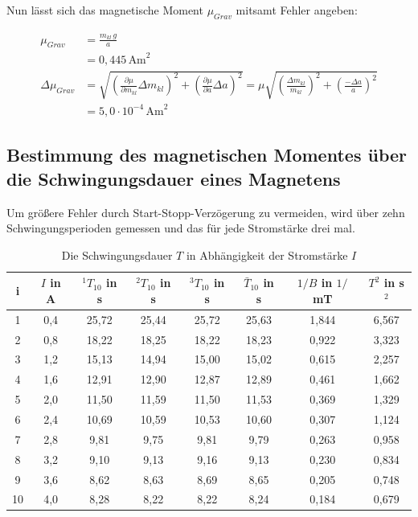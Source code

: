 Nun lässt sich das magnetische Moment $\mu_{Grav}$ mitsamt Fehler angeben:

\begin{align}
 \nonumber
 \mu_{Grav} &= \frac{m_{kl}\,g}{a} \\
 &= 0,445\, \text{Am}^2\\
 \nonumber
 \Delta \mu_{Grav} &= \sqrt{\left(\frac{\partial \mu}{\partial m_{kl}}\Delta m_{kl} \right)^2 + \left(\frac{\partial \mu}{\partial a}\Delta a \right)^2} = \mu \sqrt{\left( \frac{\Delta m_{kl}}{m_{kl}}\right)^2 + \left( \frac{-\Delta a}{a}\right)^2}\\
 &= 5,0 \cdot 10^{-4}\, \text{Am}^2
\end{align}

\subsection[Ermittlung durch Schwingungsdauer]{Bestimmung des magnetischen Momentes über die Schwingungsdauer eines Magnetens}
Um größere Fehler durch Start-Stopp-Verzögerung zu vermeiden, wird über zehn Schwingungsperioden gemessen und das für jede Stromstärke
drei mal. 

 \begin{table}[H]
  \begin{tabular}{c|c|c|c|c|c|c|c}
i & $I$ in A & $^1T_{10}$ in s & $^2T_{10}$ in s & $^3T_{10}$ in s & $\bar T_{10}$ in s & $ 1/B$ in $1/$mT & $T^2$ in s$^2$\\
  \hline
1&	0,4&	25,72&	25,44&	25,72&	25,63&	1,844&	6,567\\
2&	0,8&	18,22&	18,25&	18,22&	18,23&	0,922&	3,323\\
3&	1,2&	15,13&	14,94&	15,00&	15,02&	0,615&	2,257\\
4&	1,6&	12,91&	12,90&	12,87&	12,89&	0,461&	1,662\\
5&	2,0&	11,50&	11,59&	11,50&	11,53&	0,369&	1,329\\
6&	2,4&	10,69&	10,59&	10,53&	10,60&	0,307&	1,124\\
7&	2,8&	9,81&	9,75&	9,81&	9,79&	0,263&	0,958\\
8&	3,2&	9,10&	9,13&	9,16&	9,13&	0,230&	0,834\\
9&	3,6&	8,62&	8,63&	8,69&	8,65&	0,205&	0,748\\
10&	4,0&	8,28&	8,22&	8,22&	8,24&	0,184&	0,679    
  \end{tabular}
\caption{Die Schwingungsdauer $T$ in Abhängigkeit der Stromstärke $I$}
  \label{tabschwing}
 \end{table}

